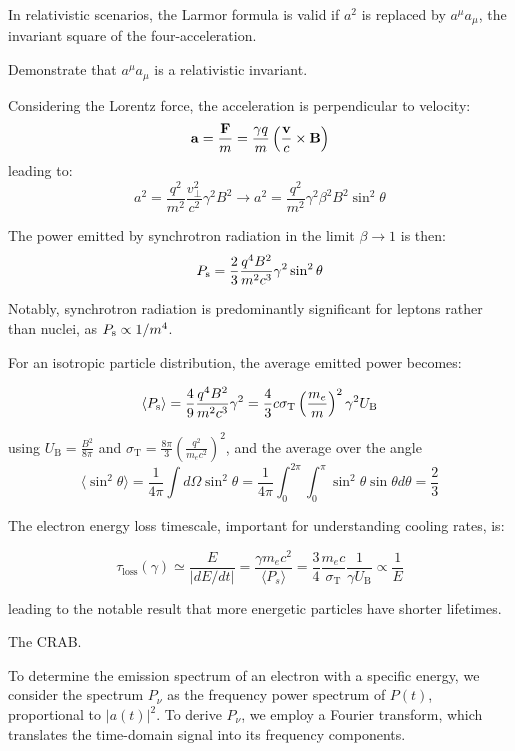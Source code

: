 In relativistic scenarios, the Larmor formula is valid if \( a^2 \) is replaced by \( a^\mu a_\mu \), the invariant square of the four-acceleration. 

\begin{problem}
Demonstrate that \( a^\mu a_\mu \)  is a relativistic invariant.
\end{problem}

Considering the Lorentz force, the acceleration is perpendicular to velocity:
%
\[
\vb a = \frac{\vb F}{m} = \frac{\gamma q}{m} \left(\frac{\vb v}{c} \times \vb B \right)
\]
%
leading to:
%
\[
a^2 = \frac{q^2}{m^2} \frac{v_\perp^2}{c^2} \gamma^2 B^2 \longrightarrow a^2 = \frac{q^2}{m^2} \gamma^2 \beta^2 B^2 \sin^2 \theta
\]

The power emitted by synchrotron radiation in the limit \( \beta \rightarrow 1 \) is then:
%
\[
P_{\rm s} = \frac{2}{3} \frac{q^4 B^2}{m^2 c^3} \gamma^2 \sin^2 \theta
\]

Notably, synchrotron radiation is predominantly significant for leptons rather than nuclei, as \( P_{\rm s} \propto 1/m^4 \).

For an isotropic particle distribution, the average emitted power becomes:
%
\begin{remark}
\[
\langle P_{\rm s} \rangle = \frac{4}{9} \frac{q^4 B^2}{m^2 c^3} \gamma^2 = \frac{4}{3} c \sigma_{\rm T} \left(\frac{m_e}{m}\right)^2 \gamma^2 U_{\rm B}
\]
\end{remark}

using \( U_{\text{B}} = \frac{B^2}{8\pi} \) and \( \sigma_{\text{T}} = \frac{8\pi}{3} \left( \frac{q^2}{m_e c^2} \right)^2 \), and the average over the angle
%
\[
\langle \sin^2 \theta \rangle = \frac{1}{4\pi} \int d\Omega \sin^2 \theta = \frac{1}{4\pi} \int_0^{2\pi} \int_0^\pi \sin^2 \theta \sin \theta d\theta = \frac{2}{3}
\]

The electron energy loss timescale, important for understanding cooling rates, is:
%
\begin{remark}
\[
\tau_{\text{loss}} (\gamma) \simeq \frac{E}{| dE/dt |} = \frac{\gamma m_e c^2}{\langle P_s \rangle} = \frac{3}{4} \frac{m_e c}{\sigma_{\text{T}}} \frac{1}{\gamma U_{\text{B}}} \propto \frac{1}{E}
\]
\end{remark}
%
leading to the notable result that more energetic particles have shorter lifetimes.

\begin{problem}
The CRAB.
\end{problem}

To determine the emission spectrum of an electron with a specific energy, we consider the spectrum \( P_\nu \) as the frequency power spectrum of \( P(t) \), proportional to \( |a(t)|^2 \). To derive \( P_\nu \), we employ a Fourier transform, which translates the time-domain signal into its frequency components.

